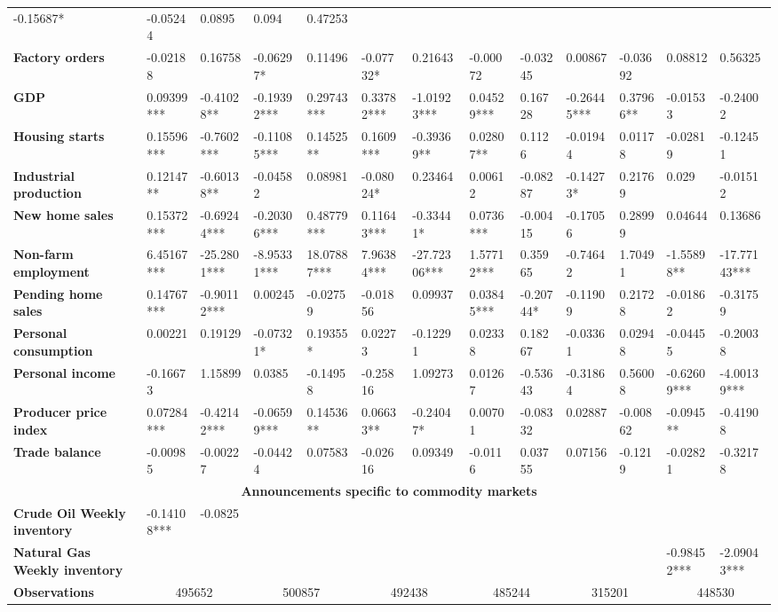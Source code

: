 \begin{sidewaystable}
{\begin{tabular}{@{}lllllllllllll@{}}
-0.15687* & -0.05244 & 0.0895 & 0.094 & 0.47253 \\ \textbf{Factory orders}& -0.02188 & 0.16758 & -0.06297* & 0.11496 & -0.07732* & 0.21643 & -0.00072 & -0.03245 & 0.00867 & -0.03692 & 0.08812 & 0.56325 \\ \textbf{GDP}& 0.09399*** & -0.41028** & -0.19392*** & 0.29743*** & 0.33782***& -1.01923***& 0.04529*** & 0.16728 & -0.26445*** & 0.37966** & -0.01533 & -0.24002 \\ \textbf{Housing starts}& 0.15596*** & -0.7602*** & -0.11085*** & 0.14525** & 0.1609***& -0.39369**& 0.02807** & 0.1126 & -0.01944 & 0.01178 & -0.02819 & -0.12451 \\ \textbf{Industrial production}& 0.12147** & -0.60138** & -0.04582 & 0.08981 & -0.08024* & 0.23464 & 0.00612 & -0.08287 & -0.14273* & 0.21769 & 0.029 & -0.01512 \\ \textbf{New home sales}& 0.15372*** & -0.69244*** & -0.20306*** & 0.48779*** & 0.11643***& -0.33441*& 0.0736*** & -0.00415 & -0.17056 & 0.28999 & 0.04644 & 0.13686 \\ \textbf{Non-farm employment}& 6.45167*** & -25.2801*** & -8.95331*** & 18.07887*** & 7.96384***& -27.72306***& 1.57712*** & 0.35965 & -0.74642 & 1.70491 & -1.55898** & -17.77143*** \\ \textbf{Pending home sales}& 0.14767*** & -0.90112*** & 0.00245 & -0.02759 & -0.01856 & 0.09937 & 0.03845*** & -0.20744* & -0.11909 & 0.21728 & -0.01862 & -0.31759 \\ \textbf{Personal consumption}& 0.00221 & 0.19129 & -0.07321* & 0.19355* & 0.02273 & -0.12291 & 0.02338 & 0.18267 & -0.03361 & 0.02948 & -0.04455 & -0.20038 \\ \textbf{Personal income}& -0.16673 & 1.15899 & 0.0385 & -0.14958 & -0.25816 & 1.09273 & 0.01267 & -0.53643 & -0.31864 & 0.56008 & -0.62609*** & -4.00139*** \\ \textbf{Producer price index}& 0.07284*** & -0.42142*** & -0.06599*** & 0.14536** & 0.06633**& -0.24047*& 0.00701 & -0.08332 & 0.02887 & -0.00862 & -0.0945** & -0.41908 \\ \textbf{Trade balance}& -0.00985 & -0.00227 & -0.04424 & 0.07583 & -0.02616 & 0.09349 & -0.0116 & 0.03755 & 0.07156 & -0.1219 & -0.02821 & -0.32178 \\  \midrule \multicolumn{13}{c}{\textbf{Announcements specific to commodity markets}} \\ \midrule \textbf{Crude Oil Weekly inventory}& -0.14108*** & -0.0825 &  &  &  &  &  &  &  &  &  &  \\ \textbf{Natural Gas Weekly inventory}&  &  &  &  &  &  &  &  &  &  & -0.98452*** & -2.09043*** \\  \midrule \textbf{Observations}             &\multicolumn{2}{c}{ 495652 }                                                 & \multicolumn{2}{c}{ 500857 }                                                 & \multicolumn{2}{c}{ 492438 }                                                 & \multicolumn{2}{c}{ 485244 }                                                 & \multicolumn{2}{c}{ 315201 }                                                   & \multicolumn{2}{c}{ 448530 }                
\end{tabular}}
\end{sidewaystable}
